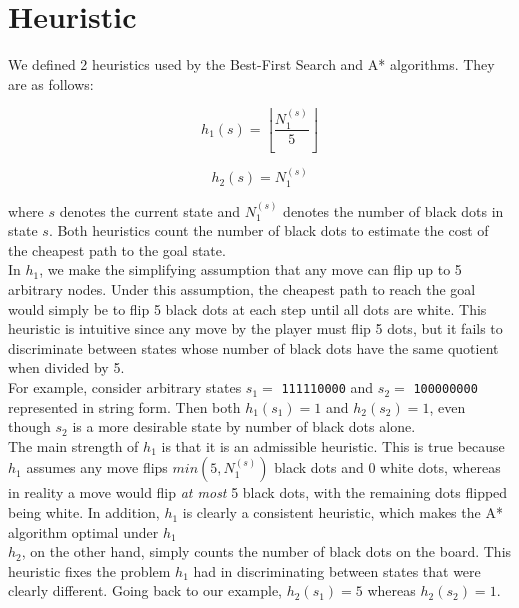 \documentclass[runningheads]{llncs}
\newcommand{\code}[1]{\texttt{#1}}
\begin{document}
\section{Heuristic}

We defined 2 heuristics used by the Best-First Search and A* algorithms. They are as follows: 

\begin{equation}
h_1(s) = \left\lfloor\dfrac{N^{(s)}_1}{5}\right\rfloor
\end{equation}

\begin{equation}
h_2(s) = N^{(s)}_1
\end{equation}

where $s$ denotes the current state and $N^{(s)}_1$ denotes the number of black dots in state $s$. Both heuristics count the number of black dots to estimate the cost of the cheapest path to the goal state. \\

In $h_1$, we make the simplifying assumption that any move can flip up to 5 arbitrary nodes. Under this assumption, the cheapest path to reach the goal would simply be to flip 5 black dots at each step until all dots are white. This heuristic is intuitive since any move by the player must flip 5 dots, but it fails to discriminate between states whose number of black dots have the same quotient when divided by 5. \\

For example, consider arbitrary states $s_1 =$ \code{111110000} and $s_2 =$ \code{100000000} represented in string form. Then both $h_1(s_1) = 1$ and $h_2(s_2) = 1$, even though $s_2$ is a more desirable state by number of black dots alone. \\

The main strength of $h_1$ is that it is an admissible heuristic. This is true because $h_1$ assumes any move flips $min(5,N^{(s)}_1)$ black dots and 0 white dots, whereas in reality a move would flip \emph{at most} 5 black dots, with the remaining dots flipped being white. In addition, $h_1$ is clearly a consistent heuristic, which makes the A* algorithm optimal under $h_1$ \cite{ref_2} \\

$h_2$, on the other hand, simply counts the number of black dots on the board. This heuristic fixes the problem $h_1$ had in discriminating between states that were clearly different. Going back to our example, $h_2(s_1) = 5$ whereas $h_2(s_2) = 1$. \\
\end{document}
